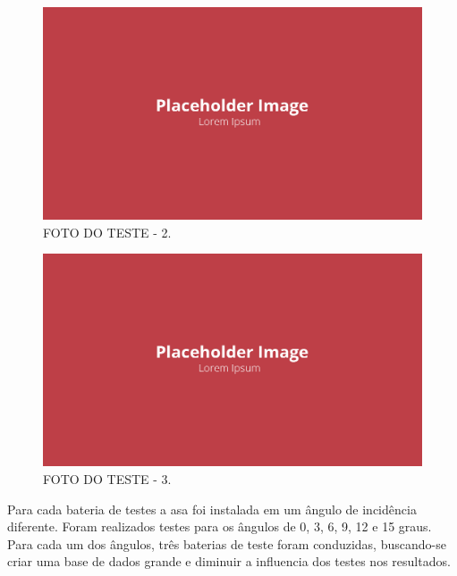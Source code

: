 \begin{figure}[!ht]
    \centering
    \includegraphics[width=.8\linewidth]{figuras/outras/placeholder.png}
    \caption{FOTO DO TESTE - 2\cite{autor}.}
    \label{fig:placeholder}
\end{figure}

\begin{figure}[!ht]
    \centering
    \includegraphics[width=.8\linewidth]{figuras/outras/placeholder.png}
    \caption{FOTO DO TESTE - 3\cite{autor}.}
    \label{fig:placeholder}
\end{figure}

Para cada bateria de testes a asa foi instalada em um ângulo de incidência diferente. Foram realizados testes para os ângulos de 0, 3, 6, 9, 12 e 15 graus. Para cada um dos ângulos, três baterias de teste foram conduzidas, buscando-se criar uma base de dados grande e diminuir a influencia dos testes nos resultados.

